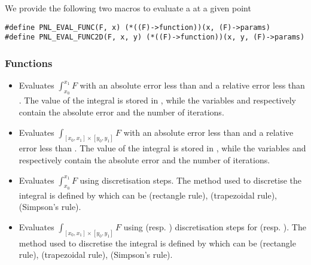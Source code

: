 We provide the following two macros to evaluate a  at
a given point
\begin{verbatim}
#define PNL_EVAL_FUNC(F, x) (*((F)->function))(x, (F)->params)
#define PNL_EVAL_FUNC2D(F, x, y) (*((F)->function))(x, y, (F)->params)
\end{verbatim}



\subsubsection{Functions}

\begin{itemize}
\item {}
  \sshortdescribe Evaluates $\int_{x_0}^{x_1} F$ with an absolute error less than
   and a relative error less than
  . The value of the integral is stored in , while the
  variables  and  respectively contain the absolute
  error and the number of iterations.

\item {}
  \sshortdescribe Evaluates $\int_{[x_0, x_1] \times [y_0, y_1]} F$ with an
  absolute error less than  and a relative error less than
  . The value of the integral is stored in , while the
  variables  and  respectively contain the absolute
  error and the number of iterations.

\item {}
  \sshortdescribe Evaluates $\int_{x_0}^{x_1} F$ using  discretisation
  steps. The method used to discretise the integral is defined by 
  which can be  (rectangle rule),  (trapezoidal rule),
   (Simpson's rule).

\item {}
  \sshortdescribe Evaluates $\int_{[x_0, x_1] \times [y_0, y_1]} F$ using
   (resp. ) discretisation steps for \var{[x0, x1]}
  (resp. \var{[y0, y1]}). The method used to discretise the integral is
  defined by  which can be  (rectangle rule),
   (trapezoidal rule),    (Simpson's rule).
\end{itemize}


